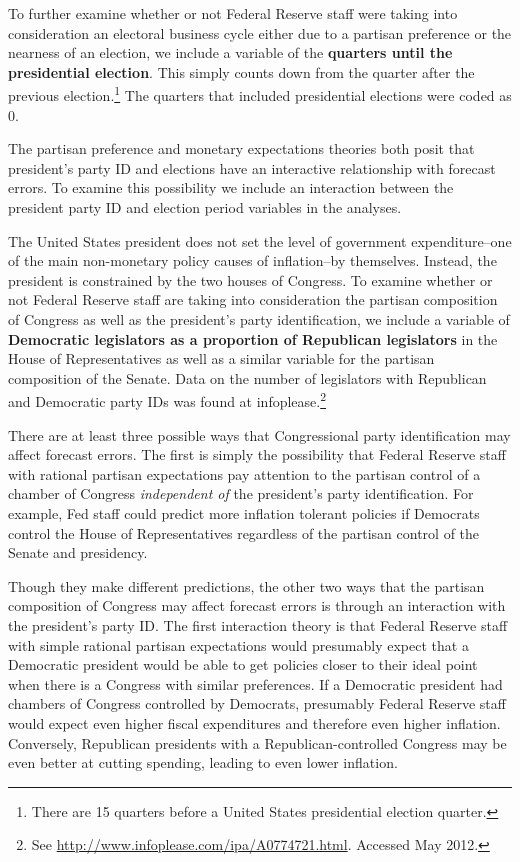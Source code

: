\documentclass[a4paper]{article}\usepackage{graphicx, color}
\begin{document}
To further examine whether or not Federal Reserve staff were taking into consideration an electoral business cycle either due to a partisan preference or the nearness of an election, we include a variable of the {\bf{quarters until the presidential election}}. This simply counts down from the quarter after the previous election.\footnote{There are 15 quarters before a United States presidential election quarter.} The quarters that included presidential elections were coded as 0. 

The partisan preference and monetary expectations theories both posit that president's party ID and elections have an interactive relationship with forecast errors. To examine this possibility we include an interaction between the president party ID and election period variables in the analyses.

The United States president does not set the level of government expenditure--one of the main non-monetary policy causes of inflation--by themselves. Instead, the president is constrained by the two houses of Congress. To examine whether or not Federal Reserve staff are taking into consideration the partisan composition of Congress as well as the president's party identification, we include a variable of {\bf{Democratic legislators as a proportion of Republican legislators}} in the House of Representatives as well as a similar variable for the partisan composition of the Senate. Data on the number of legislators with Republican and Democratic party IDs was found at infoplease.\footnote{See {\url{http://www.infoplease.com/ipa/A0774721.html}}. Accessed May 2012.} 

There are at least three possible ways that Congressional party identification may affect forecast errors. The first is simply the possibility that Federal Reserve staff with rational partisan expectations pay attention to the partisan control of a chamber of Congress {\emph{independent of}} the president's party identification.  For example, Fed staff could predict more inflation tolerant policies if Democrats control the House of Representatives regardless of the partisan control of the Senate and presidency.

Though they make different predictions, the other two ways that the partisan composition of Congress may affect forecast errors is through an interaction with the president's party ID. The first interaction theory is that Federal Reserve staff with simple rational partisan expectations would presumably expect that a Democratic president would be able to get policies closer to their ideal point when there is a Congress with similar preferences. If a Democratic president had chambers of Congress controlled by Democrats, presumably Federal Reserve staff would expect even higher fiscal expenditures and therefore even higher inflation. Conversely, Republican presidents with a Republican-controlled Congress may be even better at cutting spending, leading to even lower inflation.
\end{document}
